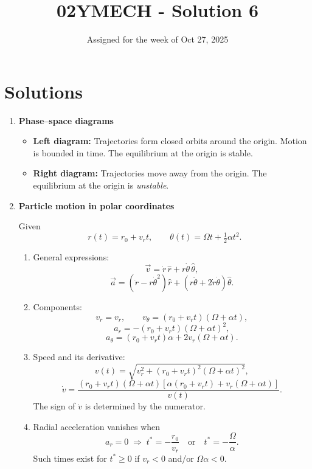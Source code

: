\documentclass[12pt]{article}
\title{02YMECH - Solution 6}
\date{Assigned for the week of Oct 27, 2025}
\author{}
\begin{document}
\maketitle

\section*{Solutions}

\begin{enumerate}
\item \textbf{Phase--space diagrams}

\begin{itemize}
\item \textbf{Left diagram:} Trajectories form closed orbits around the origin. Motion is bounded in time. The equilibrium at the origin is stable.
\item \textbf{Right diagram:} Trajectories move away from the origin. The equilibrium at the origin is \emph{unstable}.
\end{itemize}

\item \textbf{Particle motion in polar coordinates}

Given
\[
r(t)=r_0+v_r t, \qquad \theta(t)=\Omega t+\tfrac12 \alpha t^2 .
\]

\begin{enumerate}
\item[(a)] General expressions:
\[
\vec{v}=\dot r\,\hat{r} + r\dot\theta\,\hat{{\theta}},
\]
\[
\vec{a}=(\ddot r-r\dot\theta^2)\hat{r}+(r\ddot\theta+2\dot r\dot\theta)\hat{{\theta}} .
\]

\item[(b)] Components:
\[
v_r=v_r,\qquad v_\theta=(r_0+v_r t)(\Omega+\alpha t),
\]
\[
a_r=-(r_0+v_r t)(\Omega+\alpha t)^2,
\]
\[
a_\theta=(r_0+v_r t)\alpha+2v_r(\Omega+\alpha t).
\]

\item[(c)] Speed and its derivative:
\[
v(t)=\sqrt{v_r^2+(r_0+v_r t)^2(\Omega+\alpha t)^2},
\]
\[
\dot v=\frac{(r_0+v_r t)(\Omega+\alpha t)\left[\alpha(r_0+v_r t)+v_r(\Omega+\alpha t)\right]}{v(t)}.
\]
The sign of $\dot v$ is determined by the numerator.

\item[(d)] Radial acceleration vanishes when
\[
a_r=0 \;\Rightarrow\; t^*=-\frac{r_0}{v_r}\quad \text{or}\quad t^*=-\frac{\Omega}{\alpha}.
\]
Such times exist for $t^*\ge0$ if $v_r<0$ and/or $\Omega\alpha<0$.
\end{enumerate}
\end{enumerate}
\end{document}
